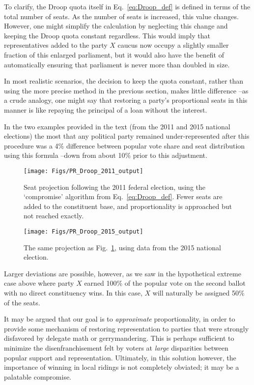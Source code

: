 \documentclass[DIV=calc, paper=a4, fontsize=11pt, twocolumn]{scrartcl}	 %
\begin{document}
To clarify, the Droop quota itself in Eq.~\ref{eq:Droop_def} is defined in terms of the total number of seats. As the number of seats is increased, this value changes. However, one might simplify the calculation by neglecting this change and keeping the Droop quota constant regardless. 
This would imply that representatives added to the party \textbf{$X$} caucus now occupy a slightly smaller fraction of this enlarged parliament, but it would also have the benefit of automatically ensuring that parliament is never more than doubled in size. 

In most realistic scenarios, the decision to keep the quota constant, rather than using the more precise method in the previous section, makes little difference \---as a crude analogy, one might say that restoring a party's proportional seats in this manner is like repaying the principal of a loan without the interest. 

In the two examples provided in the text (from the 2011 and 2015 national elections) the most that any political party remained under-represented after this procedure was a 4\% difference between popular vote share and seat distribution using this formula \---down from about 10\% prior to this adjustment. 

\begin{figure}[h!]
  \texttt{[image: Figs/PR\_Droop\_2011\_output]}
  \caption{ Seat projection following the 2011 federal election, using the `compromise' algorithm from Eq.~\ref{eq:Droop_def}. Fewer seats are added to the constituent base, and proportionality is approached but not reached exactly.}
\label{fig:Droop_2011}
\end{figure}

\begin{figure}[h!]
  \texttt{[image: Figs/PR\_Droop\_2015\_output]}
  \caption{ The same projection as Fig.~\ref{fig:Droop_2011}, using data from the 2015 national election.}
\label{fig:Droop_2015}
\end{figure}

Larger deviations are possible, however, as we saw in the hypothetical extreme case above where party \textbf{$X$} earned 100\% of the popular vote on the second ballot with no direct constituency wins. In this case, $X$ will naturally  be assigned 50\% of the seats.

It may be argued that our goal is to \emph{approximate} proportionality, in order to provide some mechanism of restoring representation to parties that were strongly disfavored by delegate math or gerrymandering. This is perhaps sufficient to minimize the disenfranchisement felt by voters at \emph{large} disparities between popular support and representation. 
Ultimately, in this solution however, the importance of winning in local ridings is not completely obviated; it may be a palatable compromise.

\end{document}
